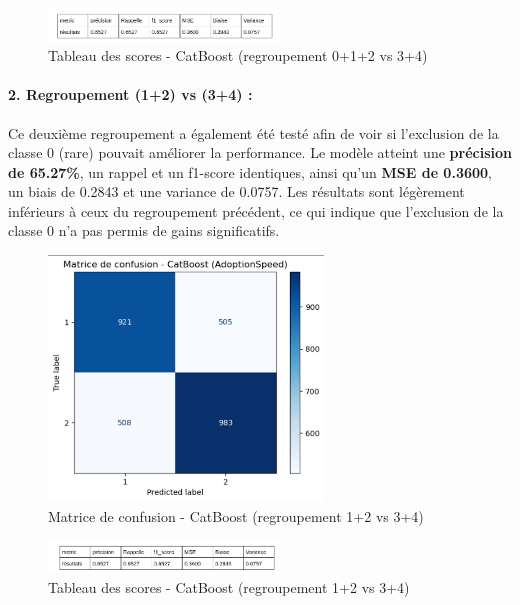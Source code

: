\documentclass[a4paper,12pt]{article}
\begin{document}
\begin{figure}[H]
    \centering
    \includegraphics[width=0.55\textwidth]{catboost_012_vs_34_scores.png}
    \caption{Tableau des scores - CatBoost (regroupement 0+1+2 vs 3+4)}
    \label{fig:catboost012_scores}
\end{figure}

\paragraph{2. Regroupement (1+2) vs (3+4) :}

Ce deuxième regroupement a également été testé afin de voir si l'exclusion de la classe 0 (rare) pouvait améliorer la performance. Le modèle atteint une \textbf{précision de 65.27\%}, un rappel et un f1-score identiques, ainsi qu’un \textbf{MSE de 0.3600}, un biais de 0.2843 et une variance de 0.0757. Les résultats sont légèrement inférieurs à ceux du regroupement précédent, ce qui indique que l'exclusion de la classe 0 n’a pas permis de gains significatifs.

\begin{figure}[H]
    \centering
    \includegraphics[width=0.65\textwidth]{catboost_12_vs_34_confusion.png}
    \caption{Matrice de confusion - CatBoost (regroupement 1+2 vs 3+4)}
    \label{fig:catboost12_conf}
\end{figure}

\begin{figure}[H]
    \centering
    \includegraphics[width=0.55\textwidth]{catboost_12_vs_34_scores.png}
    \caption{Tableau des scores - CatBoost (regroupement 1+2 vs 3+4)}
    \label{fig:catboost12_scores}
\end{figure}
\end{document}
